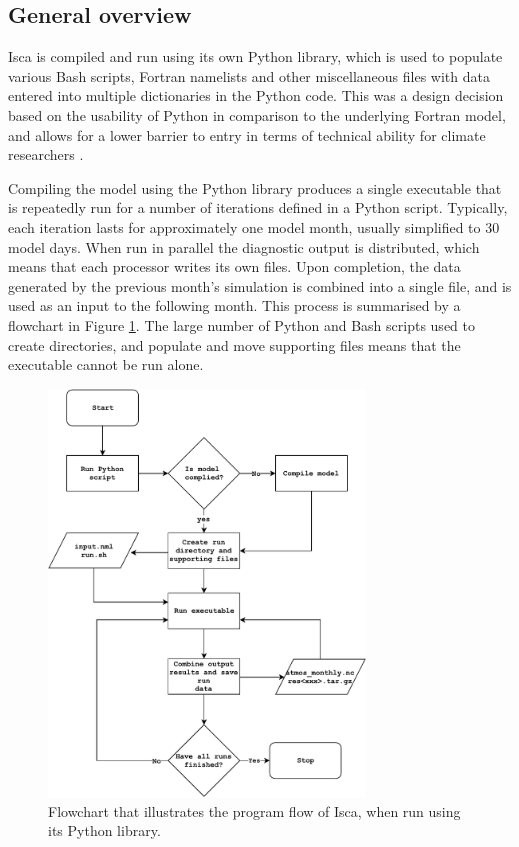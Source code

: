 \documentclass[a4paper,11pt]{report}
\begin{document}
\subsection{General overview}
Isca is compiled and run using its own Python library, which is used to populate various Bash scripts, Fortran namelists and other miscellaneous files with data entered into multiple dictionaries in the Python code. This was a design decision based on the usability of Python in comparison to the underlying Fortran model, and allows for a lower barrier to entry in terms of technical ability for climate researchers \cite{vallis2018isca}. 
\par
Compiling the model using the Python library produces a single executable that is repeatedly run for a number of iterations defined in a Python script. Typically, each iteration lasts for approximately one model month, usually simplified to 30 model days. When run in parallel the diagnostic output is distributed, which means that each processor writes its own files. Upon completion, the data generated by the previous month's simulation is combined into a single file, and is used as an input to the following month. This process is summarised by a flowchart in Figure \ref{fig:flowchart}. The large number of Python and Bash scripts used to create directories, and populate and move supporting files means that the executable cannot be run alone.
\begin{figure}[htbp]
\begin{center}
\includegraphics[width=0.75\textwidth]{img/isca_flow.pdf}
\caption{Flowchart that illustrates the program flow of Isca, when run using its Python library.}
\label{fig:flowchart}
\end{center}
\end{figure}
\end{document}
